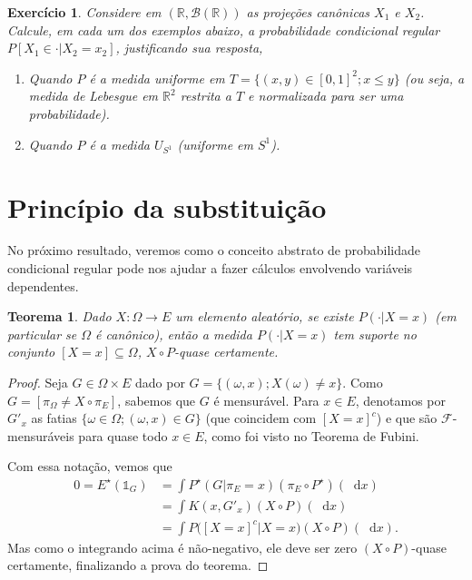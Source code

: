 \documentclass[reqno, draft]{book}
\newcommand*\1{\mathds{1}}
\newtheorem{theorem}{Teorema}[section]
\newtheorem{exercise}[example]{Exercício}
\renewcommand*\d{\mathop{}\!\mathrm{d}}
\begin{document}
\begin{exercise}
  Considere em $(\mathbb{R}, \mathcal{B}(\mathbb{R}))$ as projeções canônicas $X_1$ e $X_2$.
  Calcule, em cada um dos exemplos abaixo, a probabilidade condicional regular $P[X_1 \in \cdot|X_2 = x_2]$, justificando sua resposta,
  \begin{enumerate}[\quad a)]
  \item Quando $P$ é a medida uniforme em $T = \{(x,y) \in [0,1]^2; x \leq y\}$ (ou seja, a medida de Lebesgue em $\mathbb{R}^2$ restrita a $T$ e normalizada para ser uma probabilidade).
  \item Quando $P$ é a medida $U_{S^1}$ (uniforme em $S^1$).
  \end{enumerate}
\end{exercise}

\section{Princípio da substituição}

No próximo resultado, veremos como o conceito abstrato de probabilidade condicional regular pode nos ajudar a fazer cálculos envolvendo variáveis dependentes.

\begin{theorem}
  Dado $X: \Omega \to E$ um elemento aleatório, se existe $P(\cdot | X = x)$ (em particular se $\Omega$ é canônico), então a medida $P(\cdot | X = x)$ tem suporte no conjunto $[X = x] \subseteq \Omega$, $X \circ P$-quase certamente.
\end{theorem}

\begin{proof}
  Seja $G \in \Omega \times E$ dado por $G = \{(\omega, x); X(\omega) \neq x\}$.
  Como $G = [\pi_\Omega \neq X \circ \pi_E]$, sabemos que $G$ é mensurável.
  Para $x \in E$, denotamos por $G'_x$ as fatias $\{\omega \in \Omega; (\omega, x) \in G\}$ (que coincidem com $[X = x]^c$) e que são $\mathcal{F}$-mensuráveis para quase todo $x \in E$, como foi visto no Teorema de Fubini.

  Com essa notação, vemos que
  \begin{equation}
    \begin{split}
      0 = E^\star (\1_G) & = \int P^\star(G | \pi_E = x) (\pi_E \circ P^\star) (\d x)\\
      & = \int K(x, G'_x) (X \circ P) (\d x)\\
      & = \int P\big( [X = x]^c | X = x \big) (X \circ P) (\d x).
    \end{split}
  \end{equation}
  Mas como o integrando acima é não-negativo, ele deve ser zero $(X \circ P)$-quase certamente, finalizando a prova do teorema.
\end{proof}
\end{document}
